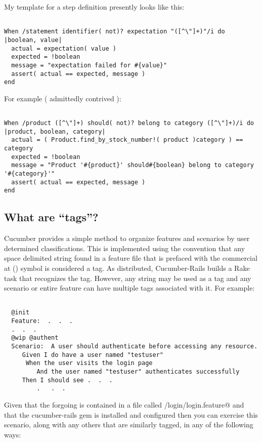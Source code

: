 My template for a step definition presently looks like this:
\begin{verbatim}

When /statement identifier( not)? expectation "([^\"]+)"/i do |boolean, value|
  actual = expectation( value )
  expected = !boolean
  message = "expectation failed for #{value}" 
  assert( actual == expected, message )
end

\end{verbatim}

For example ( admittedly contrived ):
\begin{verbatim}

When /product ([^\"]+) should( not)? belong to category ([^\"]+)/i do |product, boolean, category|
  actual = ( Product.find_by_stock_number!( product )category ) == category 
  expected = !boolean
  message = "Product '#{product}' should#{boolean} belong to category '#{category}'"
  assert( actual == expected, message )
end

\end{verbatim}

\subsection{What are ``tags''?}

Cucumber provides a simple method to organize features and scenarios by user determined classifications.  This is implemented using the convention that any space delimited string found in a feature file that is prefaced with the commercial at (\textbf{\verb@@@}) symbol is considered a tag.  As distributed, Cucumber-Rails builds a Rake task that recognizes the \emph{\verb@@wip@} tag.  However, any string may be used as a tag and any scenario or entire feature can have multiple tags associated with it.  For example:

\begin{verbatim}

  @init
  Feature:  .  .  .
  .  .  .
  @wip @authent
  Scenario:  A user should authenticate before accessing any resource.
     Given I do have a user named "testuser"
      When the user visits the login page
         And the user named "testuser" authenticates successfully
     Then I should see .  .  .
         .   .  .

\end{verbatim}

Given that the forgoing is contained in a file called \verb@features/login/login.feature@ and that the cucumber-rails gem is installed and configured then you can exercise this scenario, along with any others that are similarly tagged, in any of the following ways:

